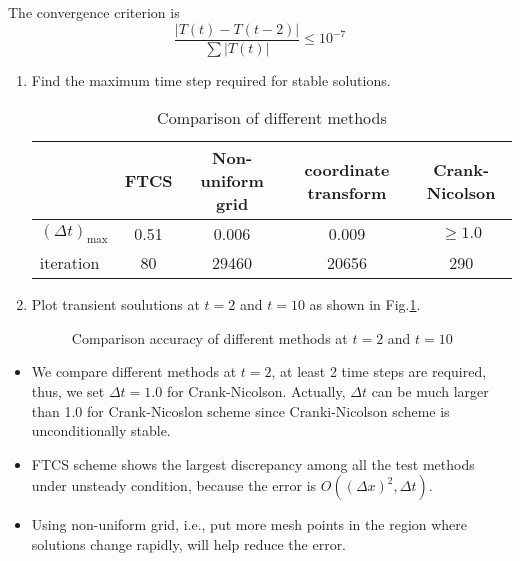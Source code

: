 \documentclass[12pt,a4paper]{article} %
\begin{document}
\begin{CJK}{UTF8}{song}
The convergence criterion is
\begin{equation}
\frac{|T(t)-T(t-2)|}{\sum |T(t)|} \leq 10^{-7}
\end{equation}

\begin{enumerate}
  \item Find the maximum time step required for stable solutions.
          \begin{table}[htbp]
          \centering
          \caption{Comparison of different methods}
          \begin{tabular}{|l|c|c|c|c|}
          \hline
           & FTCS & Non-uniform grid & coordinate transform & Crank-Nicolson \\
          \hline
          $(\Delta t)_{\max}$ & 0.51 & 0.006 & 0.009 & $\ge 1.0$ \\
          \hline
          iteration  & 80   & 29460 & 20656 & 290 \\
          \hline
          \end{tabular}
          \end{table}

  \item Plot transient soulutions at $t=2$ and $t=10$ as shown in Fig.\ref{Fig.2-time}.
          \begin{figure}[htbp]
            \centering
            \caption{Comparison accuracy of different methods at $t=2$ and $t=10$} \label{Fig.2-time}
            \end{figure}
\end{enumerate}



\begin{itemize}
    \item We compare different methods at $t=2$, at least 2 time steps are required, thus, we set $\Delta t=1.0$ for Crank-Nicolson. Actually, $\Delta t$ can be much larger than 1.0 for Crank-Nicoslon scheme since Cranki-Nicolson scheme is unconditionally stable.
    \item FTCS scheme shows the largest discrepancy among all the test methods under unsteady condition, because the error is $O((\Delta x)^{2},\Delta t)$.
    \item Using non-uniform grid, i.e., put more mesh points in the region where solutions change rapidly, will help reduce the error.
\end{itemize}




\end{CJK}
\end{document}
